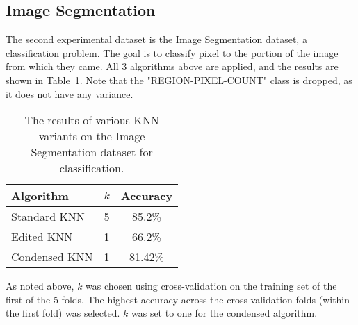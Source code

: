 \documentclass{amsart}
\begin{document}
    \subsection*{Image Segmentation}
    The second experimental dataset is the Image Segmentation dataset, a classification problem. The goal is to
    classify pixel to the portion of the image from which they came. All 3 algorithms above are applied,
    and the results are shown in Table~\ref{image_segmentation_results}. Note that the "REGION-PIXEL-COUNT"
    class is dropped, as it does not have any variance.
    \begin{table}[H]
    \begin{tabular}{lcc}
        Algorithm     & $k$ & Accuracy \\
        \hline
        Standard KNN  & 5 & 85.2\% \\
        Edited KNN    & 1 & 66.2\% \\
        Condensed KNN & 1 & 81.42\% \\
    \end{tabular}
    \label{image_segmentation_results}
    \caption{The results of various KNN variants on the Image Segmentation dataset for classification.}
    \end{table}
    As noted above, $k$ was chosen using cross-validation on the training set of the first of the 5-folds. The highest
    accuracy across the cross-validation folds (within the first fold) was selected. $k$ was set to one for the
    condensed algorithm.




\end{document}
